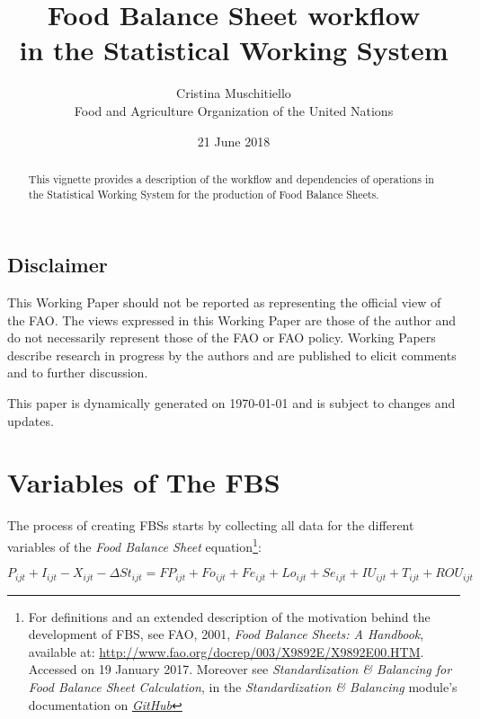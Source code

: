 \documentclass[]{article}
\title{Food Balance Sheet workflow\\
in the Statistical Working System}
\author{Cristina Muschitiello\\
Food and Agriculture Organization of the United Nations}
\date{21 June 2018}
\let\rmarkdownfootnote\footnote%
\def\footnote{\protect\rmarkdownfootnote}
\begin{document}
\maketitle
\begin{abstract}
This vignette provides a description of the workflow and dependencies of
operations in the Statistical Working System for the production of Food
Balance Sheets.
\end{abstract}

{
\setcounter{tocdepth}{4}
\tableofcontents
}
\listoftables

\listoffigures

\newpage

\subsection*{Disclaimer}\label{disclaimer}

This Working Paper should not be reported as representing the official
view of the FAO. The views expressed in this Working Paper are those of
the author and do not necessarily represent those of the FAO or FAO
policy. Working Papers describe research in progress by the authors and
are published to elicit comments and to further discussion.

This paper is dynamically generated on \today{} and is subject to
changes and updates.

\section*{Variables of The FBS}\label{variables-of-the-fbs}

The process of creating FBSs starts by collecting all data for the
different variables of the \emph{Food Balance Sheet} equation\footnote{For
  definitions and an extended description of the motivation behind the
  development of FBS, see FAO, 2001, \emph{Food Balance Sheets: A
  Handbook}, available at:
  \url{http://www.fao.org/docrep/003/X9892E/X9892E00.HTM}. Accessed on
  19 January 2017. Moreover see \emph{Standardization \& Balancing for
  Food Balance Sheet Calculation}, in the \emph{Standardization \&
  Balancing} module's documentation on
  \href{https://github.com/SWS-Methodology/faoswsStandardization/tree/master/documentation}{\emph{GitHub}}}:

\begin{equation}
\label{eq:balance1}
P_{ijt} + I_{ijt} - X_{ijt} - \Delta St_{ijt} = FP_{ijt} + Fo_{ijt} + Fe_{ijt} + Lo_{ijt} + Se_{ijt} + IU_{ijt} + T_{ijt}  + ROU_{ijt}
\end{equation}
\end{document}
